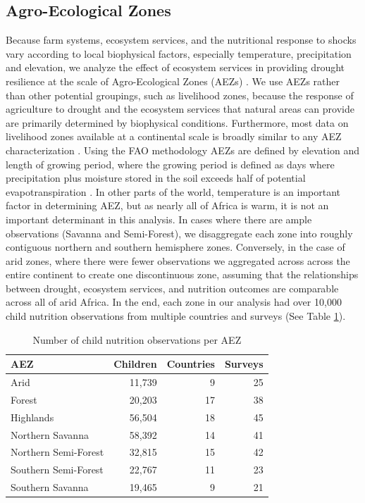 \documentclass{article}
\begin{document}
\subsection{Agro-Ecological Zones}
Because farm systems, ecosystem services, and the nutritional response to shocks vary according to local biophysical factors, especially temperature, precipitation and elevation, we analyze the effect of ecosystem services in providing drought resilience at the scale of Agro-Ecological Zones (AEZs) \citep{dimitrova2020monsoon}.  We use AEZs rather than other potential groupings, such as livelihood zones, because the response of agriculture to drought and the ecosystem services that natural areas can provide are primarily determined by biophysical conditions.  Furthermore, most data on livelihood zones available at a continental scale is broadly similar to any AEZ characterization \citep{Lynam2002}.  Using the FAO methodology \cite{Fischer2006} AEZs are defined by elevation and length of growing period, where the growing period is defined as days where precipitation plus moisture stored in the soil exceeds half of potential evapotranspiration \cite{Fischer2006}.  In other parts of the world, temperature is an important factor in determining AEZ, but as nearly all of Africa is warm, it is not an important determinant in this analysis.  In cases where there are ample observations (Savanna and Semi-Forest), we disaggregate each zone into roughly contiguous northern and southern hemisphere zones.  Conversely, in the case of arid zones, where there were fewer observations we aggregated across across the entire continent to create one discontinuous zone, assuming that the relationships between drought, ecosystem services, and nutrition outcomes are comparable across all of arid Africa.  In the end, each zone in our analysis had over 10,000 child nutrition observations from multiple countries and surveys (See Table \ref{table:AEZtab}).

\begin{table}[h]
	\begin{center}
	\begin{tabular}{l | r | r | r}
		AEZ & Children & Countries & Surveys \\
		\hline
		Arid & 11,739 & 9 & 25\\
		Forest & 20,203 & 17 & 38 \\
		Highlands & 56,504 & 18 & 45 \\
		Northern Savanna & 58,392 & 14 & 41 \\
		Northern Semi-Forest & 32,815 & 15 & 42 \\
		Southern Semi-Forest & 22,767 & 11 & 23 \\
		Southern Savanna & 19,465 & 9 & 21 \\
	\end{tabular}
\caption{Number of child nutrition observations per AEZ}
\label{table:AEZtab}
\end{center}
\end{table}
\end{document}
